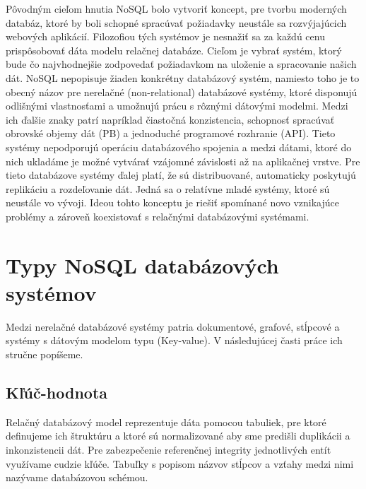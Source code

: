 \documentclass[11pt,twoside,a4paper]{book}
\begin{document}
Pôvodným cieľom hnutia NoSQL bolo vytvoriť koncept, pre tvorbu moderných databáz, ktoré by boli schopné spracúvať požiadavky neustále sa rozvýjajúcich webových aplikácií. Filozofiou tých systémov je nesnažiť sa za každú cenu prispôsobovať dáta modelu relačnej databáze. Cieľom je vybrať systém, ktorý bude čo najvhodnejšie zodpovedať požiadavkom na uloženie a spracovanie našich dát. NoSQL nepopisuje žiaden konkrétny databázový systém, namiesto toho je to obecný názov pre nerelačné (non-relational) databázové systémy, ktoré disponujú odlišnými vlastnosťami a umožnujú prácu s rôznými dátovými modelmi. Medzi ich ďalšie znaky patrí napríklad čiastočná konzistencia, schopnosť spracúvať obrovské objemy dát (PB) a jednoduché programové rozhranie (API). Tieto systémy nepodporujú operáciu databázového spojenia a medzi dátami, ktoré do nich ukladáme je možné vytvárať vzájomné závislosti až na aplikačnej vrstve. Pre tieto databázove systémy ďalej platí, že sú distribuované, automaticky poskytujú replikáciu a rozdeľovanie dát. Jedná sa o relatívne mladé systémy, ktoré sú neustále vo vývoji. Ideou tohto konceptu je riešiť spomínané novo vznikajúce problémy a zároveň koexistovať s relačnými databázovými systémami.


\section{Typy NoSQL databázových systémov}

Medzi nerelačné databázové systémy patria dokumentové, grafové, stĺpcové a systémy s dátovým modelom typu  (Key-value). V následujúcej časti práce ich stručne popíšeme.

\subsection{Kľúč-hodnota}
Relačný databázový model reprezentuje dáta pomocou tabuliek, pre ktoré definujeme ich štruktúru a ktoré sú normalizované aby sme predišli duplikácii a inkonzistencii dát. Pre zabezpečenie referenčnej integrity jednotlivých entít využívame cudzie kľúče. Tabuľky s popisom názvov stĺpcov a vzťahy medzi nimi nazývame databázovou schémou.
\end{document}
